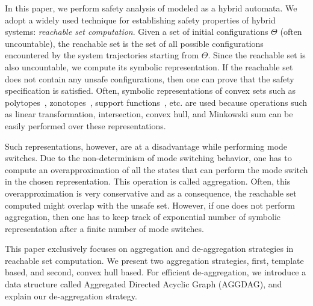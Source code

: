 In this paper, we perform safety analysis of  modeled as a hybrid automata.
%
We adopt a widely used technique for establishing safety properties of hybrid systems: {\em reachable set computation}.
%
%
Given a set of initial configurations $\Theta$ (often uncountable), the reachable set is the set of all possible configurations encountered by the system trajectories starting from $\Theta$. 
%
Since the reachable set is also uncountable, we compute its symbolic representation.
%
If the reachable set does not contain any unsafe configurations, then one can prove that the safety specification is satisfied.
%
Often, symbolic representations of convex sets such as polytopes~\cite{Frehse05_phaver}, zonotopes~\cite{girard2006efficient}, support functions~\cite{spaceex}, etc. are used because operations such as linear transformation, intersection, convex hull, and Minkowski sum can be easily performed over these representations.
%

Such representations, however, are at a disadvantage while performing mode switches.
%
Due to the non-determinism of mode switching behavior, one has to compute an overapproximation of all the states that can perform the mode switch in the chosen representation.
%
This operation is called aggregation.
%
Often, this overapproximation is very conservative and as a consequence, the reachable set computed might overlap with the unsafe set.
%
%
%
%
However, if one does not perform aggregation, then one has to keep track of exponential number of symbolic representation after a finite number of mode switches.


This paper exclusively focuses on aggregation and de-aggregation strategies in reachable set computation. 
%
We present two aggregation strategies, first, template based, and second, convex hull based. 
%
For efficient de-aggregation, we introduce a data structure called Aggregated Directed Acyclic Graph (AGGDAG), and explain our de-aggregation strategy.
%


